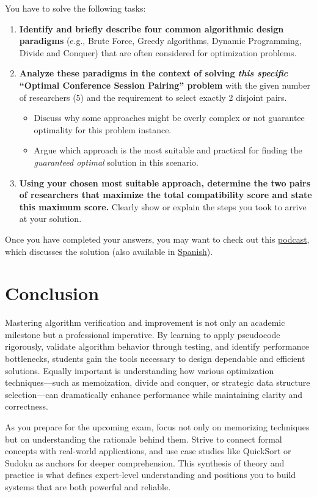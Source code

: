 \documentclass[12pt]{article}
\begin{document}
You have to solve the following tasks:
\begin{enumerate}
    \item \textbf{Identify and briefly describe four common algorithmic design paradigms} (e.g., Brute Force, Greedy algorithms, Dynamic Programming, Divide and Conquer) that are often considered for optimization problems.

    \item \textbf{Analyze these paradigms in the context of solving \textit{this specific} ``Optimal Conference Session Pairing'' problem} with the given number of researchers (5) and the requirement to select exactly 2 disjoint pairs.
    \begin{itemize}
        \item Discuss why some approaches might be overly complex or not guarantee optimality for this problem instance.
        \item Argue which approach is the most suitable and practical for finding the \textit{guaranteed optimal} solution in this scenario.
    \end{itemize}

    \item \textbf{Using your chosen most suitable approach, determine the two pairs of researchers that maximize the total compatibility score and state this maximum score.} Clearly show or explain the steps you took to arrive at your solution.
\end{enumerate}

Once you have completed your answers, you may want to check out this \href{https://drive.google.com/file/d/1V8qIq35VG609Co5lhCg9dfAnK1Nh9Qqc/view?usp=sharing}{podcast}, which discusses the solution (also available in \href{https://drive.google.com/file/d/18JeYKAB46Xrhg5K5gGM5DqsosFOl1ksJ/view?usp=sharing}{Spanish}).

\section*{Conclusion}

Mastering algorithm verification and improvement is not only an academic milestone but a professional imperative. By learning to apply pseudocode rigorously, validate algorithm behavior through testing, and identify performance bottlenecks, students gain the tools necessary to design dependable and efficient solutions. Equally important is understanding how various optimization techniques—such as memoization, divide and conquer, or strategic data structure selection—can dramatically enhance performance while maintaining clarity and correctness.

As you prepare for the upcoming exam, focus not only on memorizing techniques but on understanding the rationale behind them. Strive to connect formal concepts with real-world applications, and use case studies like QuickSort or Sudoku as anchors for deeper comprehension. This synthesis of theory and practice is what defines expert-level understanding and positions you to build systems that are both powerful and reliable.
\end{document}

